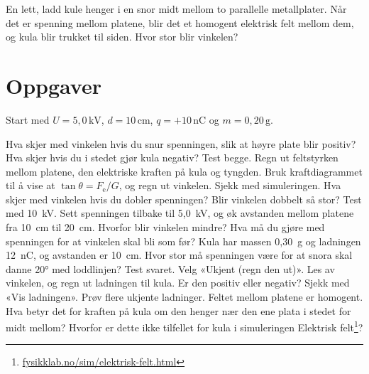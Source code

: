 \documentclass[11pt]{article}
\begin{document}

En lett, ladd kule henger i en snor midt mellom to parallelle metallplater. Når det er spenning mellom platene, blir det et homogent elektrisk felt mellom dem, og kula blir trukket til siden. Hvor stor blir vinkelen?

\section*{Oppgaver}

Start med $U = 5{,}0\,\mathrm{kV}$, $d = 10\,\mathrm{cm}$, $q = +10\,\mathrm{nC}$ og $m = 0{,}20\,\mathrm{g}$.

\begin{oppgaveliste}
\oppgave {}Hva skjer med vinkelen hvis du snur spenningen, slik at høyre plate blir positiv? Hva skjer hvis du i stedet gjør kula negativ? Test begge.
\svar
\oppgave {}Regn ut feltstyrken mellom platene, den elektriske kraften på kula og tyngden. Bruk kraftdiagrammet til å vise at $\tan  θ = F_{\mathrm{e}} / G$, og regn ut vinkelen. Sjekk med simuleringen.
\svar
\oppgave {}Hva skjer med vinkelen hvis du dobler spenningen? Blir vinkelen dobbelt så stor? Test med 10~kV.
\svar
\oppgave {}Sett spenningen tilbake til 5,0~kV, og øk avstanden mellom platene fra 10~cm til 20~cm. Hvorfor blir vinkelen mindre? Hva må du gjøre med spenningen for at vinkelen skal bli som før?
\svar
\oppgave {}Kula har massen 0,30~g og ladningen 12~nC, og avstanden er 10~cm. Hvor stor må spenningen være for at snora skal danne 20° med loddlinjen? Test svaret.
\svar
\oppgave {}Velg «Ukjent (regn den ut)». Les av vinkelen, og regn ut ladningen til kula. Er den positiv eller negativ? Sjekk med «Vis ladningen». Prøv flere ukjente ladninger.
\svar
\oppgave {}Feltet mellom platene er homogent. Hva betyr det for kraften på kula om den henger nær den ene plata i stedet for midt mellom? Hvorfor er dette ikke tilfellet for kula i simuleringen Elektrisk felt\footnote{\url{fysikklab.no/sim/elektrisk-felt.html}}?
\svar
\end{oppgaveliste}
\end{document}
